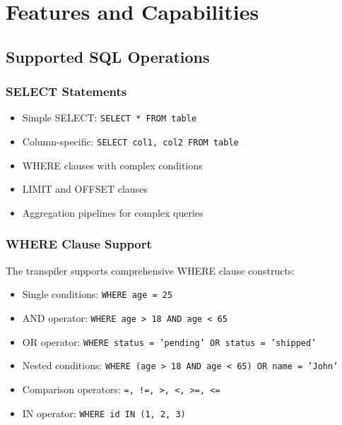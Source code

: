 \documentclass[12pt,a4paper]{article}
\begin{document}
\section{Features and Capabilities}

\subsection{Supported SQL Operations}

\subsubsection{SELECT Statements}
\begin{itemize}
    \item Simple SELECT: \texttt{SELECT * FROM table}
    \item Column-specific: \texttt{SELECT col1, col2 FROM table}
    \item WHERE clauses with complex conditions
    \item LIMIT and OFFSET clauses
    \item Aggregation pipelines for complex queries
\end{itemize}

\subsubsection{WHERE Clause Support}
The transpiler supports comprehensive WHERE clause constructs:
\begin{itemize}
    \item Single conditions: \texttt{WHERE age = 25}
    \item AND operator: \texttt{WHERE age > 18 AND age < 65}
    \item OR operator: \texttt{WHERE status = 'pending' OR status = 'shipped'}
    \item Nested conditions: \texttt{WHERE (age > 18 AND age < 65) OR name = 'John'}
    \item Comparison operators: \texttt{=, !=, >, <, >=, <=}
    \item IN operator: \texttt{WHERE id IN (1, 2, 3)}
\end{itemize}
\end{document}
